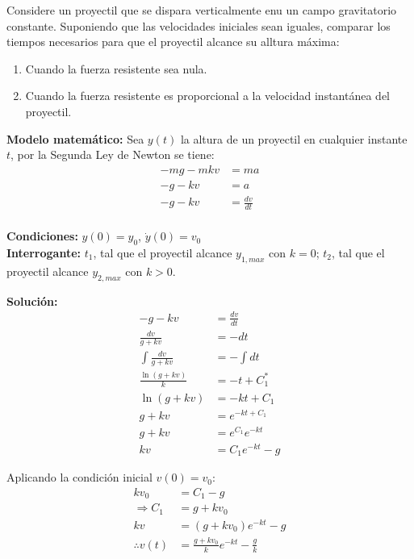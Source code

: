 Considere un proyectil que se dispara verticalmente enu un campo gravitatorio constante. Suponiendo que las velocidades
iniciales sean iguales, comparar los tiempos necesarios para que el proyectil alcance su alltura máxima:
\begin{enumerate}
    \item Cuando la fuerza resistente sea nula.
    \item Cuando la fuerza resistente es proporcional a la velocidad instantánea del proyectil.
\end{enumerate}

\noindent \textbf{Modelo matemático:} Sea $y(t)$ la altura de un proyectil en cualquier instante $t$, por la Segunda Ley 
de Newton se tiene:
\begin{align*}
    -mg-mkv &= ma \\
    -g-kv &= a \\
    -g-kv &= \frac{dv}{dt} \\
\end{align*}

\noindent \textbf{Condiciones:} $y(0)=y_{0}$, $\dot{y}(0)=v_{0}$\\
\vspace{5 mm}
\noindent \textbf{Interrogante:} $t_{1}$, tal que el proyectil alcance $y_{1,max}$ con $k=0$; $t_{2}$, tal que el proyectil
alcance $y_{2,max}$ con $k > 0$.

\vspace{5mm}
\textbf{Solución:}
\begin{align*}
    -g-kv &= \frac{dv}{dt} \\
    \frac{dv}{g+kv} &= -dt \\
    \int \frac{dv}{g+kv} &= -\int dt \\
    \frac{\ln(g+kv)}{k} &= -t + C_{1}^{*} \\
    \ln(g+kv) &= -kt + C_{1} \\
    g + kv &= e^{-kt+C_{1}} \\
    g + kv &= e^{C_{1}}e^{-kt} \\
    kv &= C_{1}e^{-kt}-g
\end{align*}

\vspace{5 mm}
Aplicando la condición inicial $v(0)=v_{0}$:
\begin{align*}
    kv_{0} &= C_{1}-g \\
    \Rightarrow C_{1} &= g+kv_{0} \\
    kv &= (g+kv_{0})e^{-kt}-g \\
    \therefore v(t) &= \frac{g+kv_{0}}{k}e^{-kt} - \frac{g}{k}
\end{align*}

